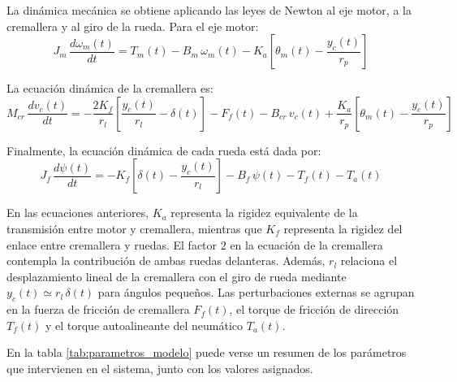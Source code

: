\documentclass{article}
\begin{document}
La dinámica mecánica se obtiene aplicando las leyes de Newton al eje motor, a la cremallera y al giro de la rueda. Para el eje motor:
\begin{equation}
J_m \, \frac{d\omega_m(t)}{dt} = T_m(t) - B_m \, \omega_m(t) - K_{a} \left[ \theta_m(t) - \frac{y_c(t)}{r_p} \right]
\label{ec_motor}
\end{equation}

La ecuación dinámica de la cremallera es:
\begin{equation}
M_{cr} \, \frac{dv_c(t)}{dt} = -\frac{2 K_f}{r_l} \left[ \frac{y_c(t)}{r_l} - \delta(t) \right] - F_f(t) - B_{cr} \, v_c(t) + \frac{K_a}{r_p} \left[ \theta_m(t) - \frac{y_c(t)}{r_p} \right]
\label{ec_cremallera}
\end{equation}

Finalmente, la ecuación dinámica de cada rueda está dada por:
\begin{equation}
J_f \, \frac{d\psi(t)}{dt} = -K_f \left[ \delta(t) - \frac{y_c(t)}{r_l} \right] - B_f \, \psi(t) - T_f(t) - T_a(t)
\label{ec_rueda}
\end{equation}

En las ecuaciones anteriores, $K_a$ representa la rigidez equivalente de la transmisión entre motor y cremallera, mientras que $K_f$ representa la rigidez del enlace entre cremallera y ruedas. El factor $2$ en la ecuación de la cremallera contempla la contribución de ambas ruedas delanteras. Además, $r_l$ relaciona el desplazamiento lineal de la cremallera con el giro de rueda mediante $y_c(t)\simeq r_l\,\delta(t)$ para ángulos pequeños. Las perturbaciones externas se agrupan en la fuerza de fricción de cremallera $F_f(t)$, el torque de fricción de dirección $T_f(t)$ y el torque autoalineante del neumático $T_a(t)$.

En la tabla \ref{tab:parametros_modelo} puede verse un resumen de los parámetros que intervienen en el sistema, junto con los valores asignados.
\end{document}
